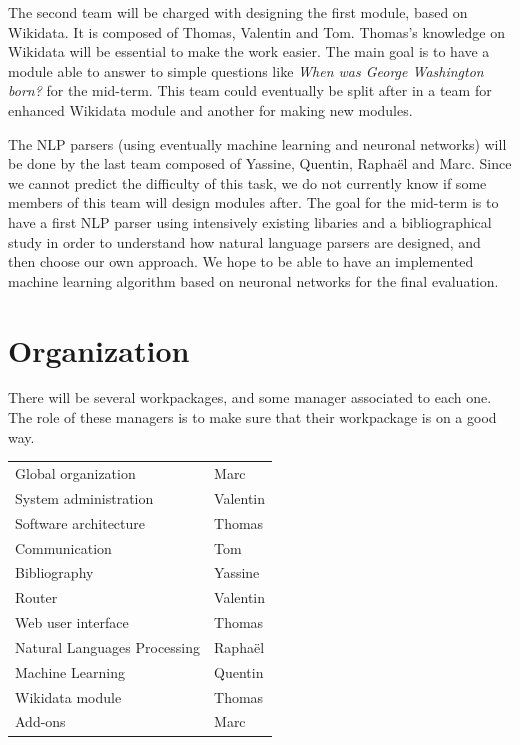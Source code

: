 \documentclass[a4paper,10pt]{article}
\begin{document}
The second team will be charged with designing the first module, based on Wikidata. It is
composed of Thomas, Valentin and Tom. Thomas's knowledge on Wikidata will be essential
to make the work easier. The main goal is to have a module able to answer to simple questions
like \textit{When was George Washington born?} for the mid-term. This team could eventually be
split after in a team for enhanced Wikidata module and another for making new modules.

The NLP parsers (using eventually machine learning and neuronal networks) will be done by the
last team composed of Yassine, Quentin, Raphaël and Marc. Since we cannot predict the difficulty
of this task, we do not currently know if some members of this team will design modules after.
The goal for the mid-term is to have a first NLP parser using intensively existing libaries and a
bibliographical study in order to understand how natural language parsers are designed, and then
choose our own approach. We hope to be able to have an implemented machine learning algorithm
based on neuronal networks for the final evaluation.

\section{Organization}

There will be several workpackages, and some manager associated to each one.
The role of these managers is to make sure that their workpackage is on a good way.

\begin{tabular}{ll}
  Global organization & Marc\\
  System administration & Valentin\\
  Software architecture & Thomas\\
  Communication & Tom\\
  Bibliography & Yassine\\
  Router & Valentin\\
  Web user interface & Thomas\\
  Natural Languages Processing & Raphaël\\
  Machine Learning & Quentin\\
  Wikidata module & Thomas\\
  Add-ons & Marc\\
\end{tabular}

\end{document}
